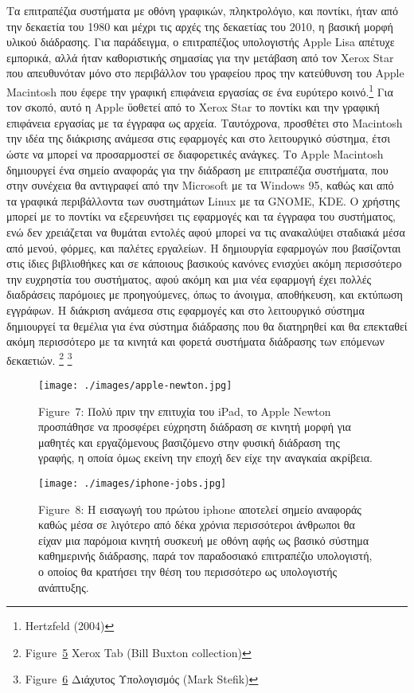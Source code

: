 \documentclass[
]{article}
\begin{document}
Τα επιτραπέζια συστήματα με οθόνη γραφικών, πληκτρολόγιο, και ποντίκι,
ήταν από την δεκαετία του 1980 και μέχρι τις αρχές της δεκαετίας του
2010, η βασική μορφή υλικού διάδρασης. Για παράδειγμα, ο επιτραπέζιος
υπολογιστής Apple Lisa απέτυχε εμπορικά, αλλά ήταν καθοριστικής σημασίας
για την μετάβαση από τον Xerox Star που απευθυνόταν μόνο στο περιβάλλον
του γραφείου προς την κατεύθυνση του Apple Macintosh που έφερε την
γραφική επιφάνεια εργασίας σε ένα ευρύτερο κοινό.\footnote{Hertzfeld
  (2004)} Για τον σκοπό, αυτό η Apple ϋοθετεί από το Xerox Star το
ποντίκι και την γραφική επιφάνεια εργασίας με τα έγγραφα ως αρχεία.
Ταυτόχρονα, προσθέτει στο Macintosh την ιδέα της διάκρισης ανάμεσα στις
εφαρμογές και στο λειτουργικό σύστημα, έτσι ώστε να μπορεί να
προσαρμοστεί σε διαφορετικές ανάγκες. Το Apple Macintosh δημιουργεί ένα
σημείο αναφοράς για την διάδραση με επιτραπέζια συστήματα, που στην
συνέχεια θα αντιγραφεί από την Microsoft με τα Windows 95, καθώς και από
τα γραφικά περιβάλλοντα των συστημάτων Linux με τα GNOME, KDE. Ο χρήστης
μπορεί με το ποντίκι να εξερευνήσει τις εφαρμογές και τα έγγραφα του
συστήματος, ενώ δεν χρειάζεται να θυμάται εντολές αφού μπορεί να τις
ανακαλύψει σταδιακά μέσα από μενού, φόρμες, και παλέτες εργαλείων. Η
δημιουργία εφαρμογών που βασίζονται στις ίδιες βιβλιοθήκες και σε
κάποιους βασικούς κανόνες ενισχύει ακόμη περισσότερο την ευχρηστία του
συστήματος, αφού ακόμη και μια νέα εφαρμογή έχει πολλές διαδράσεις
παρόμοιες με προηγούμενες, όπως το άνοιγμα, αποθήκευση, και εκτύπωση
εγγράφων. Η διάκριση ανάμεσα στις εφαρμογές και στο λειτουργικό σύστημα
δημιουργεί τα θεμέλια για ένα σύστημα διάδρασης που θα διατηρηθεί και θα
επεκταθεί ακόμη περισσότερο με τα κινητά και φορετά συστήματα διάδρασης
των επόμενων δεκαετιών. \footnote{Figure~\protect\hyperlink{fig:xerox-parc-tab}{5}
  Xerox Tab (Bill Buxton collection)} \footnote{Figure~\protect\hyperlink{fig:tabs-pads-boards}{6}
  Διάχυτος Υπολογισμός (Mark Stefik)}

\leavevmode{}%
\begin{figure}
\hypertarget{fig:apple-newton}{%
\centering
\texttt{[image: ./images/apple-newton.jpg]}
\caption{Figure~7: Πολύ πριν την επιτυχία του iPad, το Apple Newton
προσπάθησε να προσφέρει εύχρηστη διάδραση σε κινητή μορφή για μαθητές
και εργαζόμενους βασιζόμενο στην φυσική διάδραση της γραφής, η οποία
όμως εκείνη την εποχή δεν είχε την αναγκαία
ακρίβεια.}\label{fig:apple-newton}
}
\end{figure}

\leavevmode{}%
\begin{figure}
\hypertarget{fig:iphone-jobs}{%
\centering
\texttt{[image: ./images/iphone-jobs.jpg]}
\caption{Figure~8: Η εισαγωγή του πρώτου iphone αποτελεί σημείο αναφοράς
καθώς μέσα σε λιγότερο από δέκα χρόνια περισσότεροι άνθρωποι θα είχαν
μια παρόμοια κινητή συσκευή με οθόνη αφής ως βασικό σύστημα καθημερινής
διάδρασης, παρά τον παραδοσιακό επιτραπέζιο υπολογιστή, ο οποίος θα
κρατήσει την θέση του περισσότερο ως υπολογιστής
ανάπτυξης.}\label{fig:iphone-jobs}
}
\end{figure}
\end{document}
